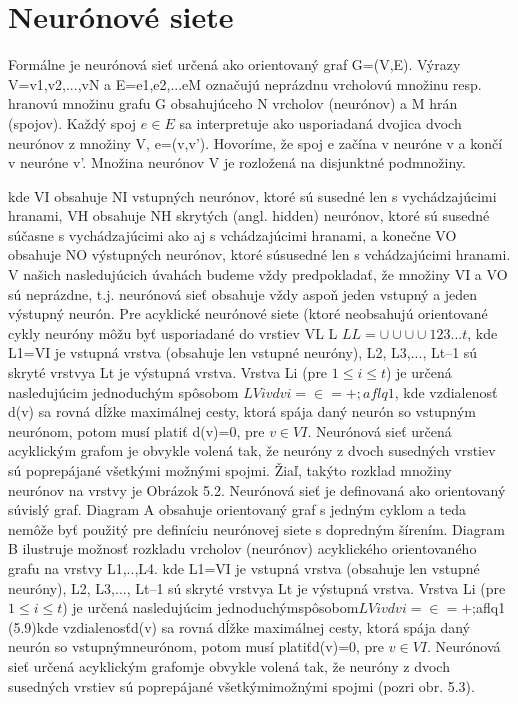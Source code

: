 \chapter{Neurónové siete}

\iffalse
Formálne  je neurónová    sieť    určená    ako    orientovaný    graf    G=(V,E).    
Výrazy V={v1,v2,...,vN}  a  E={e1,e2,...eM}  označujú  neprázdnu  vrcholovú  množinu  resp.  hranovú množinu grafu G obsahujúceho N vrcholov (neurónov) a M hrán (spojov). Každý spoj $e \in E$ sa interpretuje ako usporiadaná dvojica dvoch neurónov z množiny V, e=(v,v’).  
Hovoríme, že  spoj  e  začína  v  neuróne  v  a  končí  v  neuróne  v’.  Množina  neurónov  V  je  rozložená  na disjunktné podmnožiny.

kde VI obsahuje NI vstupných neurónov, ktoré sú susedné len s vychádzajúcimi hranami, VH obsahuje NH skrytých (angl. hidden) neurónov, ktoré sú susedné súčasne  s  vychádzajúcimi ako aj s vchádzajúcimi hranami, a konečne VO obsahuje NO výstupných neurónov, ktoré súsusedné  len  s  vchádzajúcimi  hranami.  
V  našich  nasledujúcich  úvahách  budeme  vždy predpokladať,  že  množiny  VI  a  VO  sú  neprázdne,  t.j.  neurónová  sieť  obsahuje  vždy  aspoň jeden vstupný a jeden výstupný neurón.
Pre acyklické neurónové siete (ktoré neobsahujú orientované cykly neuróny môžu byť usporiadané do vrstiev VL  L  $LL=\cup \cup \cup \cup 12 3...t$, kde L1=VI je vstupná vrstva (obsahuje len vstupné neuróny), L2, L3,..., Lt–1 sú skryté vrstvya  Lt  je  výstupná  vrstva.  
Vrstva  Li  (pre  $1\leq i\leq t$)  je  určená  nasledujúcim  jednoduchým spôsobom $LVivdvi=\in   =+;aflq1$, kde vzdialenosť d(v) sa rovná dĺžke maximálnej cesty, ktorá spája daný neurón so vstupným neurónom, potom musí platiť d(v)=0, pre $v\in VI$. 
Neurónová sieť určená acyklickým grafom je  obvykle  volená  tak,  že  neuróny  z  dvoch  susedných  vrstiev  sú  poprepájané  všetkými možnými  spojmi.  
Žiaľ,  takýto  rozklad  množiny  neurónov  na  vrstvy  je Obrázok 5.2. 
Neurónová sieť je definovaná ako orientovaný súvislý graf. 
Diagram A obsahuje orientovaný graf  s  jedným  cyklom  a  teda  nemôže  byť  použitý  pre  definíciu  neurónovej  siete  s  dopredným  šírením.
Diagram  B  ilustruje  možnosť  rozkladu  vrcholov  (neurónov)  acyklického  orientovaného  grafu  na  vrstvy L1,..,L4.
kde L1=VI je vstupná vrstva (obsahuje len vstupné neuróny), L2, L3,..., Lt–1 sú skryté vrstvya  Lt  je  výstupná  vrstva.  Vrstva  Li  (pre  $1\leq i\leq t$)  je  určená  nasledujúcim  jednoduchýmspôsobom$LVivdvi=\in   =+$;aflq1                                  (5.9)kde vzdialenosťd(v) sa rovná dĺžke maximálnej cesty, ktorá spája daný neurón so vstupnýmneurónom, potom musí platiťd(v)=0, pre $v\in VI$. Neurónová sieť určená acyklickým grafomje  obvykle  volená  tak,  že  neuróny  z  dvoch  susedných  vrstiev  sú  poprepájané  všetkýmimožnými  spojmi  (pozri  obr.  5.3). \citep{rnn:spol}

